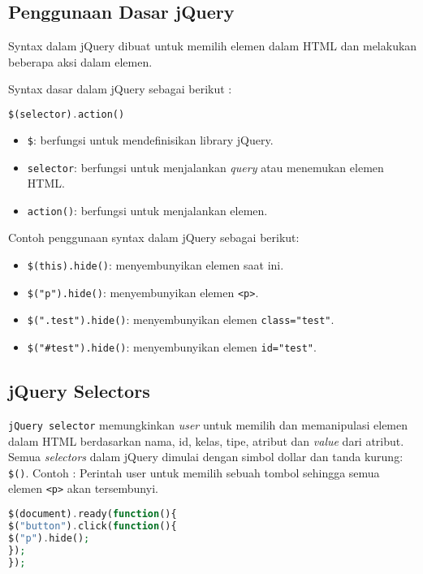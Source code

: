 \subsection{Penggunaan Dasar jQuery}
Syntax dalam jQuery dibuat untuk memilih elemen dalam HTML dan melakukan beberapa aksi dalam elemen.

Syntax dasar dalam jQuery sebagai berikut :
\begin{lstlisting}[frame=single, language=PHP, label={lst:dasarjQuery}, caption=Pemanggilan jQuery.]
$(selector).action()
\end{lstlisting}
\begin{itemize}
	\item \texttt{\$}: berfungsi untuk mendefinisikan library jQuery.
	\item \texttt{selector}: berfungsi untuk menjalankan \textit{query} atau menemukan elemen HTML.
	\item \texttt{action()}: berfungsi untuk menjalankan elemen.
\end{itemize}

Contoh penggunaan syntax dalam jQuery sebagai berikut:
\begin{itemize}
	\item \texttt{\$(this).hide()}: menyembunyikan elemen saat ini.
	\item \texttt{\$("p").hide()}: menyembunyikan elemen \texttt{<p>}.
	\item \texttt{\$(".test").hide()}: menyembunyikan elemen \texttt{class="test"}.
	\item \texttt{\$("\#test").hide()}: menyembunyikan elemen \texttt{id="test"}.
\end{itemize}
\subsection{jQuery Selectors}
\texttt{jQuery selector} memungkinkan \textit{user} untuk memilih dan memanipulasi elemen dalam HTML berdasarkan nama, id, kelas, tipe, atribut dan \textit{value} dari atribut. Semua \textit{selectors} dalam jQuery dimulai dengan simbol dollar dan tanda kurung: \texttt{\$()}.
Contoh :
Perintah user untuk memilih sebuah tombol sehingga semua elemen \texttt{<p>} akan tersembunyi.
\begin{lstlisting}[frame=single, language=PHP, label={lst:jQuerySelector}, caption=jQuery Selector pada elemen <p>.]	
$(document).ready(function(){
$("button").click(function(){
$("p").hide();
});
});

\end{lstlisting}

